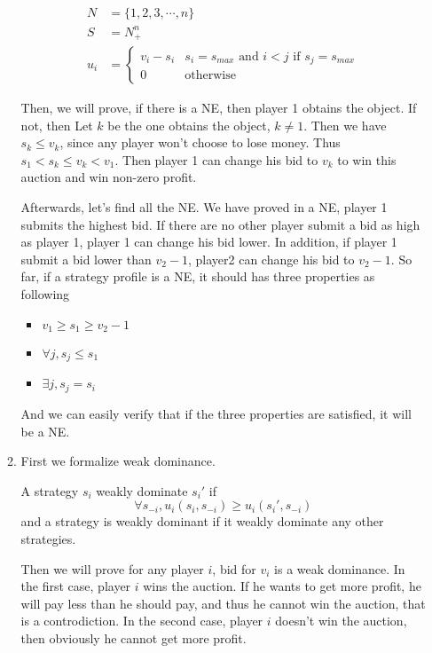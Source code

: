 \documentclass[12pt]{cgtmd}
\begin{document}
\begin{enumerate}
\begin{enumerate}
                \begin{align*}
                    N &= \{1, 2, 3, \cdots, n\} \\
                    S &= N_+^n \\
                    u_i &= \left\{ \begin{array}{ll}
                        v_i - s_i  & s_i = s_{max} \text{ and } i < j \text{ if } s_j = s_{max}\\
                        0 & \text{otherwise}
                    \end{array} \right.
                \end{align*}

                Then, we will prove, if there is a NE, then player 1 obtains the object. If not, then Let $k$ be the one obtains the object, $k \neq 1$. Then we have $s_k \leq v_k$, since any player won't choose to lose money. Thus $s_1 < s_k \leq v_k < v_1$. Then player 1 can change his bid to $v_k$ to win this auction and win non-zero profit.

                Afterwards, let's find all the NE. We have proved in a NE, player 1 submits the highest bid. If there are no other player submit a bid as high as player 1, player 1 can change his bid lower. In addition, if player 1 submit a bid lower than $v_2 - 1$, player2 can change his bid to $v_2 - 1$. So far, if a strategy profile is a NE, it should has three properties as following   
                \begin{itemize}
                    \item $v_1 \geq s_1 \geq v_2 - 1$
                    \item $\forall j, s_j \leq s_1$
                    \item $\exists j, s_j = s_i$
                \end{itemize}
                And we can easily verify that if the three properties are satisfied, it will be a NE.
            \item First we formalize weak dominance.

                A strategy $s_i$ weakly dominate $s_i'$ if
                $$\forall s_{-i}, u_i(s_i, s_{-i}) \geq u_i(s_i', s_{-i})$$
                and a strategy is weakly dominant if it weakly dominate any other strategies.

                Then we will prove for any player $i$, bid for $v_i$ is a weak dominance. In the first case, player $i$ wins the auction. If he wants to get more profit, he will pay less than he should pay, and thus he cannot win the auction, that is a controdiction. In the second case, player $i$ doesn't win the auction, then obviously he cannot get more profit.


\end{enumerate}
\end{enumerate}
\end{document}
